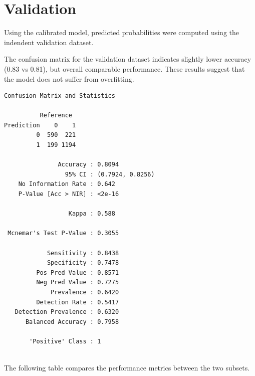 \documentclass[
]{book}
\begin{document}
\hypertarget{validation}{%
\section{Validation}\label{validation}}

Using the calibrated model, predicted probabilities were computed using the indendent validation dataset.

The confusion matrix for the validation dataset indicates slightly lower accuracy (0.83 vs 0.81), but overall comparable performance. These results suggest that the model does not suffer from overfitting.

\begin{verbatim}
Confusion Matrix and Statistics

          Reference
Prediction    0    1
         0  590  221
         1  199 1194
                                          
               Accuracy : 0.8094          
                 95% CI : (0.7924, 0.8256)
    No Information Rate : 0.642           
    P-Value [Acc > NIR] : <2e-16          
                                          
                  Kappa : 0.588           
                                          
 Mcnemar's Test P-Value : 0.3055          
                                          
            Sensitivity : 0.8438          
            Specificity : 0.7478          
         Pos Pred Value : 0.8571          
         Neg Pred Value : 0.7275          
             Prevalence : 0.6420          
         Detection Rate : 0.5417          
   Detection Prevalence : 0.6320          
      Balanced Accuracy : 0.7958          
                                          
       'Positive' Class : 1               
                                          
\end{verbatim}

The following table compares the performance metrics between the two subsets.
\end{document}
